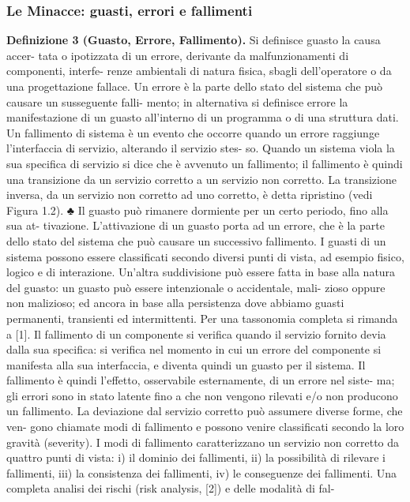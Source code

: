\documentclass[14pt]{extarticle}
\begin{document}
\subsubsection{Le Minacce: guasti, errori e fallimenti}
\textbf{Definizione 3 (Guasto, Errore, Fallimento).} Si definisce guasto la causa accer-
tata o ipotizzata di un errore, derivante da malfunzionamenti di componenti, interfe-
renze ambientali di natura fisica, sbagli dell’operatore o da una progettazione fallace.
Un errore è la parte dello stato del sistema che può causare un susseguente falli-
mento; in alternativa si definisce errore la manifestazione di un guasto all’interno di
un programma o di una struttura dati. Un fallimento di sistema è un evento che
occorre quando un errore raggiunge l’interfaccia di servizio, alterando il servizio stes-
so. Quando un sistema viola la sua specifica di servizio si dice che è avvenuto un
fallimento; il fallimento è quindi una transizione da un servizio corretto a un servizio
non corretto. La transizione inversa, da un servizio non corretto ad uno corretto, è
detta ripristino (vedi Figura 1.2).
♣
Il guasto può rimanere dormiente per un certo periodo, fino alla sua at-
tivazione. L’attivazione di un guasto porta ad un errore, che è la parte dello
stato del sistema che può causare un successivo fallimento. I guasti di un
sistema possono essere classificati secondo diversi punti di vista, ad esempio
fisico, logico e di interazione. Un’altra suddivisione può essere fatta in base
alla natura del guasto: un guasto può essere intenzionale o accidentale, mali-
zioso oppure non malizioso; ed ancora in base alla persistenza dove abbiamo
guasti permanenti, transienti ed intermittenti. Per una tassonomia completa
si rimanda a [1].
Il fallimento di un componente si verifica quando il servizio fornito devia
dalla sua specifica: si verifica nel momento in cui un errore del componente
si manifesta alla sua interfaccia, e diventa quindi un guasto per il sistema. Il
fallimento è quindi l’effetto, osservabile esternamente, di un errore nel siste-
ma; gli errori sono in stato latente fino a che non vengono rilevati e/o non
producono un fallimento.
La deviazione dal servizio corretto può assumere diverse forme, che ven-
gono chiamate modi di fallimento e possono venire classificati secondo la loro
gravità (severity). I modi di fallimento caratterizzano un servizio non corretto
da quattro punti di vista:
i) il dominio dei fallimenti,
ii) la possibilità di rilevare i fallimenti,
iii) la consistenza dei fallimenti,
iv) le conseguenze dei fallimenti.
Una completa analisi dei rischi (risk analysis, [2]) e delle modalità di fal-
\end{document}
